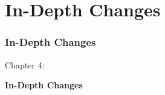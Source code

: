 %

\section{In-Depth Changes}
\begin{frame}[fragile]
	\frametitle{In-Depth Changes}

	\begin{center}\huge{Chapter 4:}\end{center}
	\begin{center}\huge{\color{typo3darkgrey}\textbf{In-Depth Changes}}\end{center}

\end{frame}


